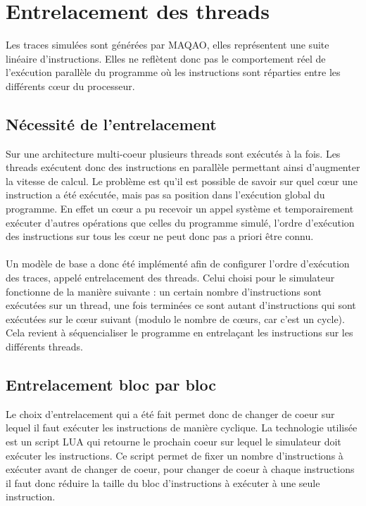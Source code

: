 \section{Entrelacement des threads}

Les traces simulées sont générées par MAQAO, elles représentent une suite linéaire d'instructions. Elles ne reflètent donc pas le comportement réel de l'exécution parallèle du programme où les instructions sont réparties entre les différents c\oe ur du processeur. 

\subsection{Nécessité de l'entrelacement}

Sur une architecture multi-coeur plusieurs threads sont exécutés à la fois. Les threads exécutent donc des instructions en parallèle permettant ainsi d'augmenter la vitesse de calcul. Le problème est qu'il est possible de savoir sur quel c\oe ur une instruction a été exécutée, mais pas sa position dans l'exécution global du programme. En effet un c\oe ur a pu recevoir un appel système et temporairement exécuter d'autres opérations que celles du programme simulé, l'ordre d'exécution des instructions sur tous les c\oe ur ne peut donc pas a priori être connu. 

\paragraph{}
Un modèle de base a donc été implémenté afin de configurer l'ordre d'exécution des traces, appelé entrelacement des threads. Celui choisi pour le simulateur fonctionne de la manière suivante : un certain nombre d'instructions sont exécutées sur un thread, une fois terminées ce sont autant d'instructions qui sont exécutées sur le c\oe ur suivant (modulo le nombre de c\oe urs, car c'est un cycle). Cela revient à séquencialiser le programme en entrelaçant les instructions sur les différents threads.

\subsection{Entrelacement bloc par bloc}

Le choix d'entrelacement qui a été fait permet donc de changer de coeur sur lequel il faut exécuter les instructions de manière cyclique. La technologie utilisée est un script LUA qui retourne le prochain coeur sur lequel le simulateur doit exécuter les instructions. Ce script permet de fixer un nombre d'instructions à exécuter avant de changer de coeur, pour changer de coeur à chaque instructions il faut donc réduire la taille du bloc d'instructions à exécuter à une seule instruction.\\

